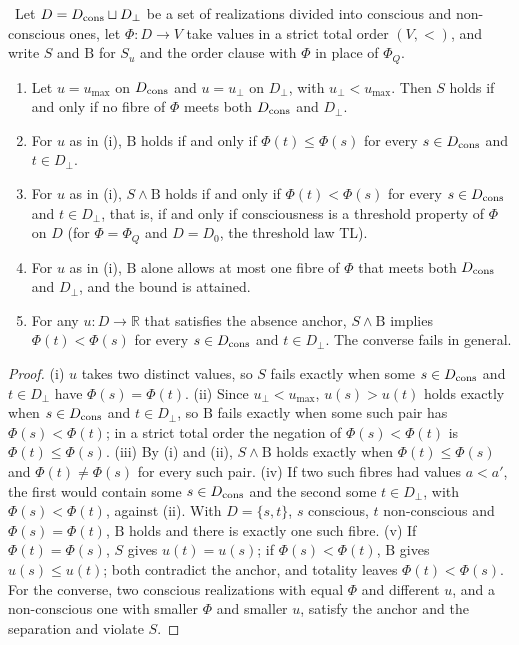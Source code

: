 \begin{theorem}\label{thm:threshold}
\stA\ Let $D=D_{\rm cons}\sqcup D_\bot$ be a set of realizations divided into conscious and non-conscious ones, let $\Phi:D\to V$ take values in a strict total order $(V,<)$, and write $S$ and $\mathrm B$ for $S_u$ and the order clause with $\Phi$ in place of $\Phi_Q$.
\begin{enumerate}
\item[(i)] Let $u=u_{\max}$ on $D_{\rm cons}$ and $u=u_\bot$ on $D_\bot$, with $u_\bot<u_{\max}$. Then $S$ holds if and only if no fibre of $\Phi$ meets both $D_{\rm cons}$ and $D_\bot$.
\item[(ii)] For $u$ as in (i), $\mathrm B$ holds if and only if $\Phi(t)\le\Phi(s)$ for every $s\in D_{\rm cons}$ and $t\in D_\bot$.
\item[(iii)] For $u$ as in (i), $S\wedge\mathrm B$ holds if and only if $\Phi(t)<\Phi(s)$ for every $s\in D_{\rm cons}$ and $t\in D_\bot$, that is, if and only if consciousness is a threshold property of $\Phi$ on $D$ (for $\Phi=\Phi_Q$ and $D=D_0$, the threshold law TL).
\item[(iv)] For $u$ as in (i), $\mathrm B$ alone allows at most one fibre of $\Phi$ that meets both $D_{\rm cons}$ and $D_\bot$, and the bound is attained.
\item[(v)] For any $u:D\to\mathbb R$ that satisfies the absence anchor, $S\wedge\mathrm B$ implies $\Phi(t)<\Phi(s)$ for every $s\in D_{\rm cons}$ and $t\in D_\bot$. The converse fails in general.
\end{enumerate}
\end{theorem}
\begin{proof}
(i) $u$ takes two distinct values, so $S$ fails exactly when some $s\in D_{\rm cons}$ and $t\in D_\bot$ have $\Phi(s)=\Phi(t)$. (ii) Since $u_\bot<u_{\max}$, $u(s)>u(t)$ holds exactly when $s\in D_{\rm cons}$ and $t\in D_\bot$, so $\mathrm B$ fails exactly when some such pair has $\Phi(s)<\Phi(t)$; in a strict total order the negation of $\Phi(s)<\Phi(t)$ is $\Phi(t)\le\Phi(s)$. (iii) By (i) and (ii), $S\wedge\mathrm B$ holds exactly when $\Phi(t)\le\Phi(s)$ and $\Phi(t)\ne\Phi(s)$ for every such pair. (iv) If two such fibres had values $a<a'$, the first would contain some $s\in D_{\rm cons}$ and the second some $t\in D_\bot$, with $\Phi(s)<\Phi(t)$, against (ii). With $D=\{s,t\}$, $s$ conscious, $t$ non-conscious and $\Phi(s)=\Phi(t)$, $\mathrm B$ holds and there is exactly one such fibre. (v) If $\Phi(t)=\Phi(s)$, $S$ gives $u(t)=u(s)$; if $\Phi(s)<\Phi(t)$, $\mathrm B$ gives $u(s)\le u(t)$; both contradict the anchor, and totality leaves $\Phi(t)<\Phi(s)$. For the converse, two conscious realizations with equal $\Phi$ and different $u$, and a non-conscious one with smaller $\Phi$ and smaller $u$, satisfy the anchor and the separation and violate $S$.
\end{proof}

